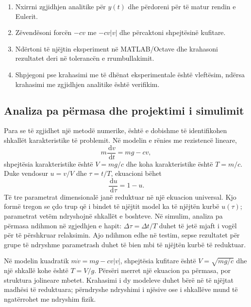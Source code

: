 \documentclass[11pt,oneside,openany]{book}
\newcommand{\dd}{\,\mathrm{d}}
\begin{document}
\begin{enumerate}
\item Nxirrni zgjidhjen analitike për $y(t)$ dhe përdoreni për të matur rendin e Eulerit.
\item Zëvendësoni forcën $-cv$ me $-cv|v|$ dhe përcaktoni shpejtësinë kufitare.
\item Ndërtoni të njëjtin eksperiment në MATLAB/Octave dhe krahasoni rezultatet deri në tolerancën e rrumbullakimit.
\item Shpjegoni pse krahasimi me të dhënat eksperimentale është vleftësim, ndërsa krahasimi me zgjidhjen analitike është verifikim.
\end{enumerate}



\subsection{Analiza pa përmasa dhe projektimi i simulimit}
Para se të zgjidhet një metodë numerike, është e dobishme të identifikohen shkallët karakteristike të problemit. Në modelin e rënies me rezistencë lineare,
\begin{equation}
 m\frac{\dd v}{\dd t}=mg-cv,
\end{equation}
shpejtësia karakteristike është $V=mg/c$ dhe koha karakteristike është $T=m/c$. Duke vendosur $u=v/V$ dhe $\tau=t/T$, ekuacioni bëhet
\begin{equation}
 \frac{\dd u}{\dd\tau}=1-u.
\end{equation}
Të tre parametrat dimensionalë janë reduktuar në një ekuacion universal. Kjo formë tregon se çdo trup që i bindet të njëjtit model ka të njëjtën kurbë $u(\tau)$; parametrat vetëm ndryshojnë shkallët e boshteve. Në simulim, analiza pa përmasa ndihmon në zgjedhjen e hapit: $\Delta\tau=\Delta t/T$ duhet të jetë mjaft i vogël për të përshkruar relaksimin. Ajo ndihmon edhe në testim, sepse rezultatet për grupe të ndryshme parametrash duhet të bien mbi të njëjtën kurbë të reduktuar.

Në modelin kuadratik $m\dot v=mg-cv|v|$, shpejtësia kufitare është $V=\sqrt{mg/c}$ dhe një shkallë kohe është $T=V/g$. Përsëri merret një ekuacion pa përmasa, por struktura jolineare mbetet. Krahasimi i dy modeleve duhet bërë në të njëjtat madhësi të reduktuara; përndryshe ndryshimi i njësive ose i shkallëve mund të ngatërrohet me ndryshim fizik.
\end{document}
